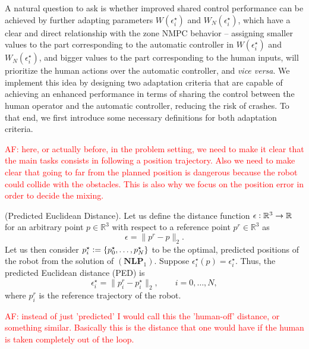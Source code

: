A natural question to ask is whether improved shared control performance can be achieved by further adapting parameters $W(\epsilon_i^\star)$ and ${W}_N(\epsilon_i^\star)$, which have a clear and direct relationship with the zone NMPC behavior -- assigning smaller values to the part corresponding to the automatic controller in $W(\epsilon_i^\star)$ and ${W}_N(\epsilon_i^\star)$, and bigger values to the part corresponding to the human inputs, will prioritize the human actions over the automatic controller, and \textit{vice versa}. We implement this idea by designing two adaptation criteria that are capable of achieving an enhanced performance in terms of sharing the control between the human operator and the automatic controller, reducing the risk of crashes. To that end, we first introduce some necessary definitions for both adaptation criteria. 

\textcolor{red}{AF: here, or actually before, in the problem setting, we need to make it clear that the main tasks consists in following a position trajectory. Also we need to make clear that going to far from the planned position is dangerous because the robot could collide with the obstacles. This is also why we focus on the position error in order to decide the mixing.}

\begin{definition}(Predicted Euclidean Distance). Let us define the distance function $\epsilon \vcentcolon \mathbb{R}^3 \rightarrow \mathbb{R}$ for an arbitrary point $p \in \mathbb{R}^3$ with respect to a reference point $p^r \in \mathbb{R}^3$ as
\begin{equation*}
	\epsilon = \|p^r-p\|_2.
\end{equation*}
	Let us then consider $p^\star_i \vcentcolon = \{p_0^\star, \dots, p_N^\star\}$ to be the optimal, predicted positions of the robot from the solution of $(\mathbf{NLP}_1)$. Suppose $\epsilon_i^\star(p) = \epsilon_i^\star$. Thus, the predicted Euclidean distance (PED) is 
	\begin{equation}
		\epsilon_i^\star = \|p_i^r-p_i^\star \|_2, \,\,\,\,\,\,\,\,\,\,\,\, i = 0, \dots, N,\label{eq:ped}%
	\end{equation}
	where $p_i^r$ is the reference trajectory of the robot.
\end{definition}

\textcolor{red}{AF: instead of just 'predicted' I would call this the 'human-off' distance, or something similar. Basically this is the distance that one would have if the human is taken completely out of the loop.}

